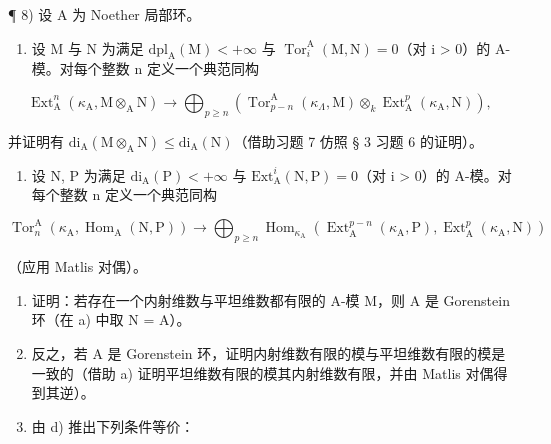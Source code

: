 ¶ 8) 设 A 为 Noether 局部环。

\begin{enumerate}
\def\labelenumi{\alph{enumi})}
\tightlist
\item
  设 M 与 N 为满足 \(\mathrm{dpl}_{\mathrm{A}}(\mathrm{M}) < +\infty\) 与 \(\operatorname{Tor}_{i}^{\mathrm{A}}(\mathrm{M}, \mathrm{N}) = 0\)（对 i \textgreater{} 0）的 A-模。对每个整数 n 定义一个典范同构
\end{enumerate}

\[
\operatorname{Ext} _ {\mathrm{A}} ^ {n} \left(\kappa_ {\mathrm{A}}, \mathrm{M} \otimes_ {\mathrm{A}} \mathrm{N}\right) \longrightarrow \bigoplus_ {p \geqslant n} \left(\operatorname{Tor} _ {p - n} ^ {\mathrm{A}} \left(\kappa_ {\Lambda}, \mathrm{M}\right) \otimes_ {k} \operatorname{Ext} _ {\mathrm{A}} ^ {p} \left(\kappa_ {\mathrm{A}}, \mathrm{N}\right)\right),
\]

并证明有 \(\mathrm{di}_{\mathrm{A}}(\mathrm{M}\otimes_{\mathrm{A}}\mathrm{N})\leqslant \mathrm{di}_{\mathrm{A}}(\mathrm{N})\)（借助习题 7 仿照 § 3 习题 6 的证明）。

\begin{enumerate}
\def\labelenumi{\alph{enumi})}
\setcounter{enumi}{1}
\tightlist
\item
  设 N, P 为满足 \(\mathrm{di}_{\mathrm{A}}(\mathrm{P}) < +\infty\) 与 \(\mathrm{Ext}_{\mathrm{A}}^{i}(\mathrm{N},\mathrm{P}) = 0\)（对 i \textgreater{} 0）的 A-模。对每个整数 n 定义一个典范同构
\end{enumerate}

\[
\operatorname{Tor} _ {n} ^ {\mathrm{A}} \left(\kappa_ {\mathrm{A}}, \operatorname{Hom} _ {\mathrm{A}} (\mathrm{N}, \mathrm{P})\right) \longrightarrow \bigoplus_ {p \geqslant n} \operatorname{Hom} _ {\kappa_ {\mathrm{A}}} \left(\operatorname{Ext} _ {\mathrm{A}} ^ {p - n} \left(\kappa_ {\mathrm{A}}, \mathrm{P}\right), \operatorname{Ext} _ {\mathrm{A}} ^ {p} \left(\kappa_ {\mathrm{A}}, \mathrm{N}\right)\right)
\]

（应用 Matlis 对偶）。

\begin{enumerate}
\def\labelenumi{\alph{enumi})}
\setcounter{enumi}{2}
\item
  证明：若存在一个内射维数与平坦维数都有限的 A-模 M，则 A 是 Gorenstein 环（在 a) 中取 N = A）。
\item
  反之，若 A 是 Gorenstein 环，证明内射维数有限的模与平坦维数有限的模是一致的（借助 a) 证明平坦维数有限的模其内射维数有限，并由 Matlis 对偶得到其逆）。
\item
  由 d) 推出下列条件等价：
\end{enumerate}

